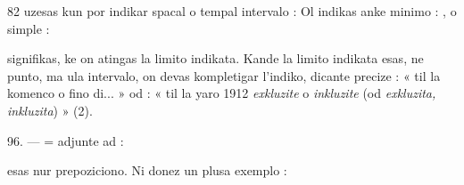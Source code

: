 \begin{VUpage}[86]{82}
 uzesas kun  por indikar spacal o tempal intervalo :\nl
{} Ol indikas anke\nl
minimo : , o simple :\nl
{}

 signifikas, ke on atingas la limito indikata. Kande\nl
la limito indikata esas, ne punto, ma ula intervalo, on devas\nl
kompletigar l'indiko, dicante precize : « til la komenco o\nl
fino di... » od : « til la yaro 1912 \textit{exkluzite} o \textit{inkluzite} (od\nl
\textit{exkluzita, inkluzita}) » (2).

\VUblanc{5.94pt}%
96. ---  = adjunte ad : \nl
{}\nl
{}

 esas nur prepoziciono. Ni donez un plusa exemplo :
\end{VUpage}

